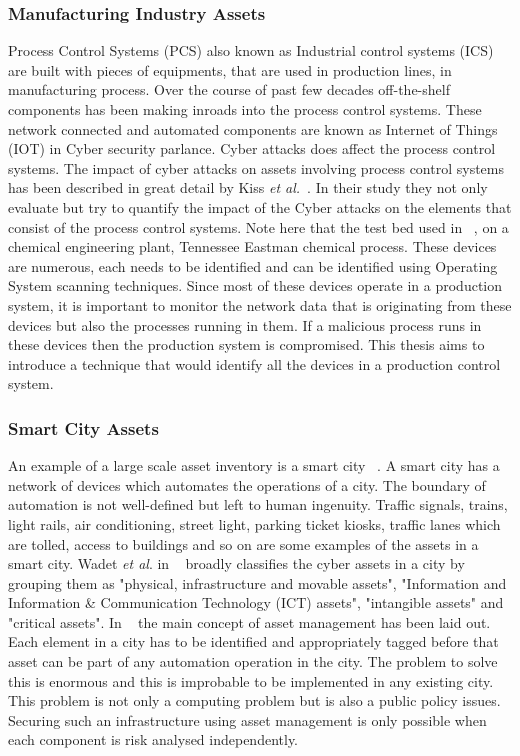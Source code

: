 \subsubsection{Manufacturing Industry Assets}\label{sec:manu}
Process Control Systems (PCS) also known as Industrial control systems (ICS) are built with pieces of equipments, that are used in production lines, in manufacturing process. Over the course of past few decades off-the-shelf components has been making inroads into the process control systems. These network connected and automated components are known as Internet of Things (IOT) in Cyber security parlance. Cyber attacks does affect the process control systems. The impact of cyber attacks on assets involving process control systems has been described in great detail by Kiss \textit{et al.}~\cite{7145073}. In their study they not only evaluate but try to quantify the impact of the Cyber attacks on the elements that consist of the process control systems. Note here that the test bed used in ~\cite{7145073}, on a chemical engineering plant, Tennessee Eastman chemical process. These devices are numerous, each needs to be identified and can be identified using Operating System scanning techniques. Since most of these devices operate in a production system, it is important to monitor the network data that is originating from these devices but also the processes running in them. If a malicious process runs in these devices then the production system is compromised. This thesis aims to introduce a technique that would identify all the devices in a production control system.\\

\subsubsection{Smart City Assets}\label{sec:smcity}
An example of a large scale asset inventory is a smart city ~\cite{7580812}. A smart city has a network of devices which automates the operations of a city. The boundary of automation is not well-defined but left to human ingenuity. Traffic signals, trains, light rails, air conditioning, street light, parking ticket kiosks, traffic lanes which are tolled, access to buildings and so on are some examples of the assets in a smart city. Wadet \textit{et al}. in ~\cite{7580812} broadly classifies the cyber assets in a city by grouping them as "physical, infrastructure and movable assets", "Information and Information \& Communication Technology (ICT) assets", "intangible assets" and "critical assets". In ~\cite[Figure 3]{7580812} the main concept of asset management has been laid out. Each element in a city has to be identified and appropriately tagged before that asset can be part of any automation operation in the city. The problem to solve this is enormous and this is improbable to be implemented in any existing city. This problem is not only a computing problem but is also a public policy issues. Securing such an infrastructure using asset management is only possible when each component is risk analysed independently. \\ 

